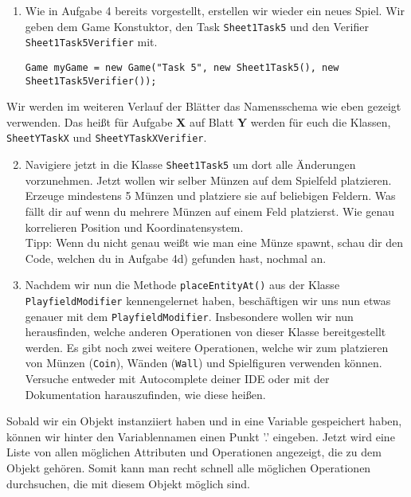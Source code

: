 

\begin{enumerate}
    \item Wie in Aufgabe 4 bereits vorgestellt, erstellen wir wieder ein neues Spiel. Wir geben dem Game Konstuktor, den Task \texttt{Sheet1Task5} und den Verifier \texttt{Sheet1Task5Verifier} mit.

    \begin{lstlisting}
Game myGame = new Game("Task 5", new Sheet1Task5(), new Sheet1Task5Verifier());
    \end{lstlisting}
\end{enumerate}

\begin{Infobox}
    Wir werden im weiteren Verlauf der Blätter das Namensschema wie eben gezeigt verwenden. Das heißt für Aufgabe \textbf{X} auf Blatt \textbf{Y} werden für euch die Klassen, \texttt{SheetYTaskX} und \texttt{SheetYTaskXVerifier}.
\end{Infobox}

\begin{enumerate} \setcounter{enumi}{1}
    \item Navigiere jetzt in die Klasse \texttt{Sheet1Task5} um dort alle Änderungen vorzunehmen. Jetzt wollen wir selber Münzen auf dem Spielfeld platzieren. Erzeuge mindestens 5 Münzen und platziere sie auf beliebigen Feldern. Was fällt dir auf wenn du mehrere Münzen auf einem Feld platzierst. Wie genau korrelieren Position und Koordinatensystem.\\
        Tipp: Wenn du nicht genau weißt wie man eine Münze spawnt, schau dir den Code, welchen du in Aufgabe 4d) gefunden hast, nochmal an.

    \item Nachdem wir nun die Methode \texttt{placeEntityAt()} aus der Klasse \texttt{PlayfieldModifier} kennengelernet haben, beschäftigen wir uns nun etwas genauer mit dem \texttt{PlayfieldModifier}. Insbesondere wollen wir nun herausfinden, welche anderen Operationen von dieser Klasse bereitgestellt werden. Es gibt noch zwei weitere Operationen, welche wir zum platzieren von Münzen (\texttt{Coin}), Wänden (\texttt{Wall}) und Spielfiguren verwenden können. Versuche entweder mit Autocomplete deiner IDE oder mit der Dokumentation harauszufinden, wie diese heißen.
\end{enumerate}

\begin{Infobox}[Autocompletion]
    Sobald wir ein Objekt instanziiert haben und in eine Variable gespeichert haben, können wir hinter den Variablennamen einen Punkt '.' eingeben. Jetzt wird eine Liste von allen möglichen Attributen und Operationen angezeigt, die zu dem Objekt gehören. Somit kann man recht schnell alle möglichen Operationen durchsuchen, die mit diesem Objekt möglich sind.
\end{Infobox}

